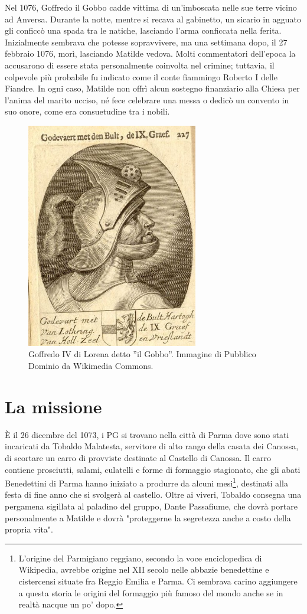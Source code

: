 \documentclass[letterpaper,twocolumn,openany,nodeprecatedcode]{dndbook}
\begin{document}
Nel 1076, Goffredo il Gobbo cadde vittima di un'imboscata nelle sue terre vicino ad Anversa. Durante la notte, mentre si recava al gabinetto, un sicario in agguato gli conficcò una spada tra le natiche, lasciando l'arma conficcata nella ferita. Inizialmente sembrava che potesse sopravvivere, ma una settimana dopo, il 27 febbraio 1076, morì, lasciando Matilde vedova. Molti commentatori dell'epoca la accusarono di essere stata personalmente coinvolta nel crimine; tuttavia, il colpevole più probabile fu indicato come il conte fiammingo Roberto I delle Fiandre. In ogni caso, Matilde non offrì alcun sostegno finanziario alla Chiesa per l'anima del marito ucciso, né fece celebrare una messa o dedicò un convento in suo onore, come era consuetudine tra i nobili.

\begin{figure}
\centering
\includegraphics[width=7.5cm]{img/goffredo-il-gobbo.png}
    \caption{\textsf{Goffredo IV di Lorena detto ''il Gobbo''. Immagine di Pubblico Dominio da Wikimedia Commons.}}
    \label{fig:goffredo}
\end{figure}

\section{La missione}
È il 26 dicembre del 1073, i PG si trovano nella città di Parma dove sono stati incaricati da Tobaldo Malatesta, servitore di alto rango della casata dei Canossa, di scortare un carro di provviste destinate al Castello di Canossa. Il carro contiene prosciutti, salami, culatelli e forme di formaggio stagionato, che gli abati Benedettini di Parma hanno iniziato a produrre da alcuni mesi\footnote{L'origine del Parmigiano reggiano, secondo la voce enciclopedica di Wikipedia, avrebbe origine nel XII secolo nelle abbazie benedettine e cistercensi situate fra Reggio Emilia e Parma. Ci sembrava carino aggiungere a questa storia le origini del formaggio più famoso del mondo anche se in realtà nacque un po' dopo.}, destinati alla festa di fine anno che si svolgerà al castello. Oltre ai viveri, Tobaldo consegna una pergamena sigillata al paladino del gruppo, Dante Passafiume, che dovrà portare personalmente a Matilde e dovrà "proteggerne la segretezza anche a costo della propria vita".
\end{document}
